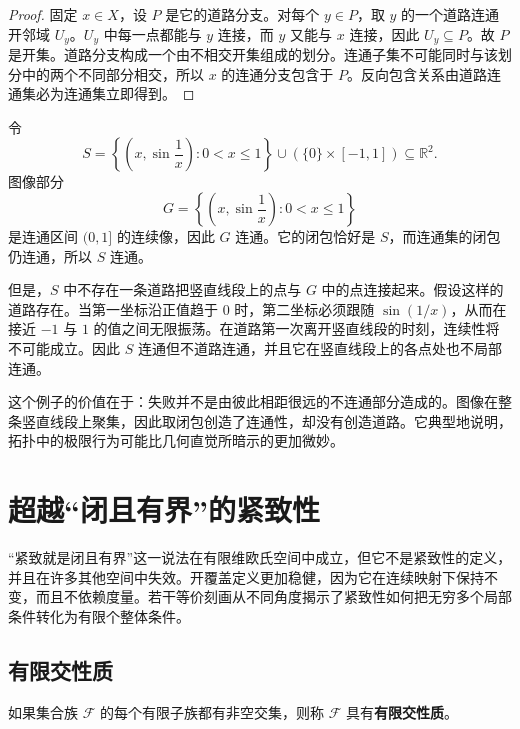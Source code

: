 \begin{proof}
固定 $x\in X$，设 $P$ 是它的道路分支。对每个 $y\in P$，取 $y$ 的一个道路连通开邻域 $U_y$。$U_y$ 中每一点都能与 $y$ 连接，而 $y$ 又能与 $x$ 连接，因此 $U_y\subseteq P$。故 $P$ 是开集。道路分支构成一个由不相交开集组成的划分。连通子集不可能同时与该划分中的两个不同部分相交，所以 $x$ 的连通分支包含于 $P$。反向包含关系由道路连通集必为连通集立即得到。
\end{proof}

\begin{example}[拓扑学家的正弦曲线]
令
\[
    S=\left\{\left(x,\sin\frac1x\right):0<x\leq 1\right\}
      \cup\left(\{0\}\times[-1,1]\right)\subseteq\mathbb{R}^2.
\]
图像部分
\[
    G=\left\{\left(x,\sin\frac1x\right):0<x\leq 1\right\}
\]
是连通区间 $(0,1]$ 的连续像，因此 $G$ 连通。它的闭包恰好是 $S$，而连通集的闭包仍连通，所以 $S$ 连通。

但是，$S$ 中不存在一条道路把竖直线段上的点与 $G$ 中的点连接起来。假设这样的道路存在。当第一坐标沿正值趋于 $0$ 时，第二坐标必须跟随 $\sin(1/x)$，从而在接近 $-1$ 与 $1$ 的值之间无限振荡。在道路第一次离开竖直线段的时刻，连续性将不可能成立。因此 $S$ 连通但不道路连通，并且它在竖直线段上的各点处也不局部连通。
\end{example}

\begin{remark}
这个例子的价值在于：失败并不是由彼此相距很远的不连通部分造成的。图像在整条竖直线段上聚集，因此取闭包创造了连通性，却没有创造道路。它典型地说明，拓扑中的极限行为可能比几何直觉所暗示的更加微妙。
\end{remark}

\section{超越“闭且有界”的紧致性}

“紧致就是闭且有界”这一说法在有限维欧氏空间中成立，但它不是紧致性的定义，并且在许多其他空间中失效。开覆盖定义更加稳健，因为它在连续映射下保持不变，而且不依赖度量。若干等价刻画从不同角度揭示了紧致性如何把无穷多个局部条件转化为有限个整体条件。

\subsection{有限交性质}

\begin{definition}[有限交性质]
如果集合族 $\mathcal{F}$ 的每个有限子族都有非空交集，则称 $\mathcal{F}$ 具有\textbf{有限交性质}。
\end{definition}

